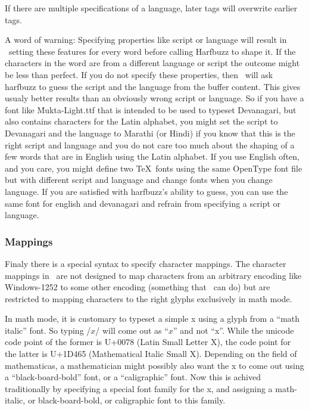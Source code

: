 If there are multiple specifications of a language, later tags will overwrite earlier tags.

A word of warning: Specifying properties like script or language will result in
\HiTeX\ setting these features for every word before calling Harfbuzz
to shape it. If the characters in the word are from a different language
or script the outcome might be less than perfect. If you do not specify
these properties, then \HiTeX\ will ask harfbuzz to guess the script and the language
from the buffer content.
This gives usualy better results than an obviously
wrong script or language. So if you have a font like \.{Mukta-Light.ttf} that is
intended to be used to typeset Devanagari, but also contains characters for the Latin alphabet,
you might set the script to Devanagari and the language to Marathi (or Hindi)
if you know that this is the right script and language and you do not care
too much about the shaping of a few words that are in English using the Latin
alphabet. If you use English often, and you care, you might define two
\TeX\ fonts using the same OpenType font file but with different script and language
and change fonts when you change language. If you are satisfied with
harfbuzz's ability to guess, you can use the same font for english and devanagari
and refrain from specifying a script or language.

\subsubsection{Mappings}
Finaly there is a special syntax to specify character mappings. The character mappings
in \HiTeX\ are not designed to map characters from an arbitrary encoding like Windows-1252
to some other encoding (something that \XeTeX\ can do) but are restricted to mapping characters
to the right glyphs exclusively in math mode.

In math mode, it is customary to typeset a simple x using a glyph from a ``math italic'' font.
So typing \verbatim/$x$/ will come out as ``$x$'' and not ``x''.
While the unicode code point of the former is U+0078 (Latin Small Letter X),
the code point for the latter is  U+1D465 (Mathematical Italic Small X).
Depending on the field of mathematicas, a mathematician might possibly
also want the x to come out using a ``black-board-bold'' font, or a ``caligraphic'' font.
Now this is achived traditionally by specifying a special font family for the x,
and assigning a math-italic, or black-board-bold, or caligraphic font to this family.

